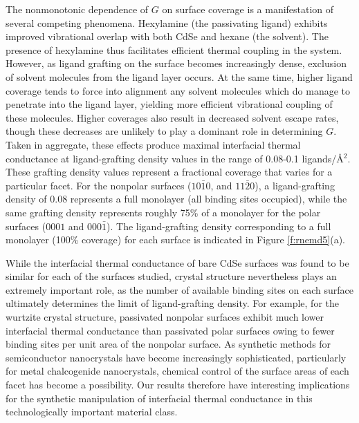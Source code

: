 The nonmonotonic dependence of $G$ on surface coverage is a manifestation of several competing phenomena. Hexylamine (the passivating ligand) exhibits improved vibrational overlap with both CdSe and hexane (the solvent). The presence of hexylamine thus facilitates efficient thermal coupling in the system. However, as ligand grafting on the surface becomes increasingly dense, exclusion of solvent molecules from the ligand layer occurs. At the same time, higher ligand coverage tends to force into alignment any solvent molecules which do manage to penetrate into the ligand layer, yielding more efficient vibrational coupling of these molecules. Higher coverages also result in decreased solvent escape rates, though these decreases are unlikely to play a dominant role in determining $G$. Taken in aggregate, these effects produce maximal interfacial thermal conductance at ligand-grafting density values in the range of 0.08-0.1 ligands/\r{A}$^2$. These grafting density values represent a fractional coverage that varies for a particular facet. For the nonpolar surfaces ($10\bar{1}0$, and $11\bar{2}0$), a ligand-grafting density of 0.08 represents a full monolayer (all binding sites occupied), while the same grafting density represents roughly 75\% of a monolayer for the polar surfaces ($0001$ and $000\bar{1}$). The ligand-grafting density corresponding to a full monolayer (100\% coverage) for each surface is indicated in Figure \ref{f:rnemd5}(a). \par

While the interfacial thermal conductance of bare CdSe surfaces was found to be similar for each of the surfaces studied, crystal structure nevertheless plays an extremely important role, as the number of available binding sites on each surface ultimately determines the limit of ligand-grafting density. For example, for the wurtzite crystal structure, passivated nonpolar surfaces exhibit much lower interfacial thermal conductance than passivated polar surfaces owing to fewer binding sites per unit area of the nonpolar surface. As synthetic methods for semiconductor nanocrystals have become increasingly sophisticated, particularly for metal chalcogenide nanocrystals, chemical control of the surface areas of each facet has become a possibility. Our results therefore have interesting implications for the synthetic manipulation of interfacial thermal conductance in this technologically important material class. \par

